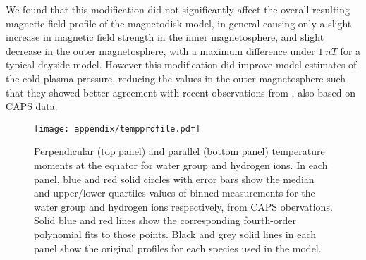 We found that this modification did not significantly affect the overall resulting magnetic field profile of the magnetodisk model, in general causing only a slight increase in magnetic field strength in the inner magnetosphere, and slight decrease in the outer magnetosphere, with a maximum difference under $\SI{1}{nT}$ for a typical dayside model. However this modification did improve model estimates of the cold plasma pressure, reducing the values in the outer magnetosphere such that they showed better agreement with recent observations from \citet{sergis2017}, also based on CAPS data.

\begin{figure}
\centering
\texttt{[image: appendix/tempprofile.pdf]}
\caption[Equatorial profiles of temperature moments from \citet{wilson2017}, with best fit polynomials.]{Perpendicular (top panel) and parallel (bottom panel) temperature moments at the equator for water group and hydrogen ions. In each panel, blue and red solid circles with error bars show the median and upper/lower quartiles values of binned measurements for the water group and hydrogen ions respectively, from \citet{wilson2017} CAPS obervations. Solid blue and red lines show the corresponding fourth-order polynomial fits to those points. Black and grey solid lines in each panel show the original profiles for each species used in the \citet{achilleos2010b} model.}
\label{appendix:fig:tempprofile}
\end{figure}



